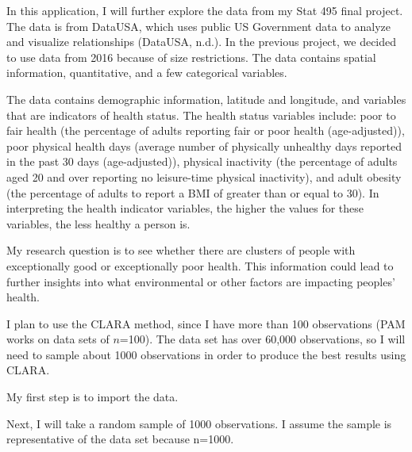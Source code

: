\documentclass[12pt,twoside]{amherstthesis}
\begin{document}
  In this application, I will further explore the data from my Stat 495
  final project. The data is from DataUSA, which uses public US Government
  data to analyze and visualize relationships (DataUSA, n.d.). In the
  previous project, we decided to use data from 2016 because of size
  restrictions. The data contains spatial information, quantitative, and a
  few categorical variables.
  
  The data contains demographic information, latitude and longitude, and
  variables that are indicators of health status. The health status
  variables include: poor to fair health (the percentage of adults
  reporting fair or poor health (age-adjusted)), poor physical health days
  (average number of physically unhealthy days reported in the past 30
  days (age-adjusted)), physical inactivity (the percentage of adults aged
  20 and over reporting no leisure-time physical inactivity), and adult
  obesity (the percentage of adults to report a BMI of greater than or
  equal to 30). In interpreting the health indicator variables, the higher
  the values for these variables, the less healthy a person is.
  
  My research question is to see whether there are clusters of people with
  exceptionally good or exceptionally poor health. This information could
  lead to further insights into what environmental or other factors are
  impacting peoples' health.
  
  I plan to use the CLARA method, since I have more than 100 observations
  (PAM works on data sets of \(n\)=100). The data set has over 60,000
  observations, so I will need to sample about 1000 observations in order
  to produce the best results using CLARA.
  
  My first step is to import the data.
  
  Next, I will take a random sample of 1000 observations. I assume the
  sample is representative of the data set because n=1000.
  
  \begin{Shaded}
  \begin{Highlighting}[]
  \NormalTok{(}\NormalTok{)}
  \StringTok{ }\NormalTok{data_subset[}\NormalTok{(}\OperatorTok{:}\NormalTok{,}
     \NormalTok{),]}
  \end{Highlighting}
  \end{Shaded}
  
\end{document}
